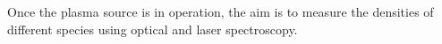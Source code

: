 \documentclass[11pt, oneside]{article}   	%
\begin{document}
Once the plasma source is in operation, the aim is to measure the densities of different species using optical and laser spectroscopy.

\end{document}
